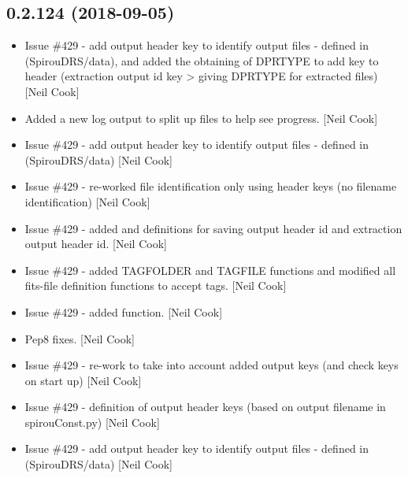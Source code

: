 \documentclass[a4paper,10pt,english]{report}
\begin{document}
\subsection{0.2.124 (2018-09-05)}
\label{\detokenize{misc/changelog:id335}}\begin{itemize}
\item {} 
Issue \#429 - add output header key to identify output files
 - defined in  (SpirouDRS/data), and added
the obtaining of DPRTYPE to add   key to header (extraction
output id key \textendash{}\textgreater{} giving DPRTYPE for extracted files) {[}Neil Cook{]}

\item {} 
Added a new log output to split up files to help see progress. {[}Neil
Cook{]}

\item {} 
Issue \#429 - add output header key to identify output files
 - defined in  (SpirouDRS/data) {[}Neil Cook{]}

\item {} 
Issue \#429 - re-worked file identification only using header keys (no
filename identification) {[}Neil Cook{]}

\item {} 
Issue \#429 - added  and  definitions for saving
output header id and extraction output header id. {[}Neil Cook{]}

\item {} 
Issue \#429 - added TAGFOLDER and TAGFILE functions and modified all
fits-file definition functions to accept tags. {[}Neil Cook{]}

\item {} 
Issue \#429 - added  function. {[}Neil Cook{]}

\item {} 
Pep8 fixes. {[}Neil Cook{]}

\item {} 
Issue \#429 - re-work  to take into account added
output keys (and check keys on start up) {[}Neil Cook{]}

\item {} 
Issue \#429 - definition of output header keys (based on output
filename in spirouConst.py) {[}Neil Cook{]}

\item {} 
Issue \#429 - add output header key to identify output files
 - defined in  (SpirouDRS/data) {[}Neil Cook{]}


\end{itemize}
\end{document}
